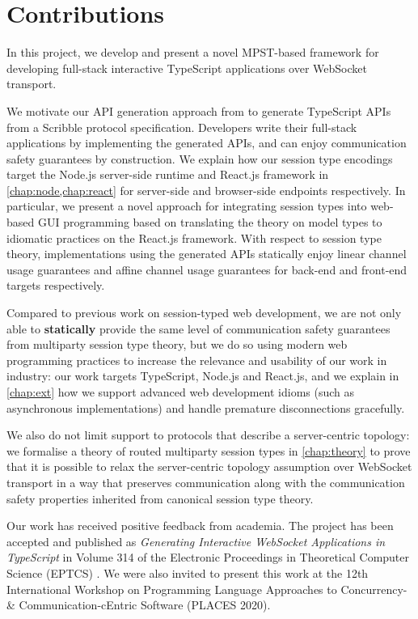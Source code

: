 \section{Contributions}

In this project, we develop and present a novel
MPST-based framework for developing full-stack
interactive TypeScript applications over WebSocket transport.

We motivate our API generation approach from 
\cite{Hybrid2016,PureScript2019} to generate TypeScript APIs
from a Scribble protocol specification.
Developers write their full-stack applications
by implementing the generated APIs, and can enjoy 
communication safety guarantees by construction.
We explain how our session type encodings target the Node.js
server-side runtime and React.js framework in
\cref{chap:node,chap:react} for server-side
and browser-side endpoints respectively.
In particular, we present a novel approach for integrating
session types into web-based GUI programming based on
translating the theory on model types \cite{MVU2020}
to idiomatic practices on the React.js framework.
With respect to session type theory, implementations using
the generated APIs statically enjoy linear channel usage
guarantees and affine channel usage guarantees for back-end
and front-end targets respectively.

Compared to previous work 
\cite{Exceptional,PureScript2019,MVU2020,LINKS} on
session-typed web development, 
we are not only able to
\textbf{statically} provide the same level of communication safety
guarantees from multiparty session type theory, but we do so
using modern web programming practices to increase
the relevance and usability of our work in industry:
our work targets TypeScript, Node.js and React.js,
and we explain in \cref{chap:ext} how we support advanced
web development idioms (such as asynchronous implementations)
and handle premature disconnections gracefully.

We also do not limit support to protocols that describe
a server-centric topology: we formalise 
a theory of routed multiparty session types in 
\cref{chap:theory} to prove that it is possible to relax the
server-centric topology assumption over WebSocket transport in a way 
that preserves communication along with the communication safety 
properties inherited from canonical session type theory.

Our work has received positive feedback from academia.
The project has been accepted and published as 
\emph{Generating Interactive WebSocket Applications in TypeScript}
in Volume 314 of the Electronic Proceedings in Theoretical
Computer Science (EPTCS) \cite{PLACES2020}.
We were also invited to present this work
at the 12th International Workshop on
Programming Language Approaches to Concurrency- \& 
Communication-cEntric Software (PLACES 2020).


